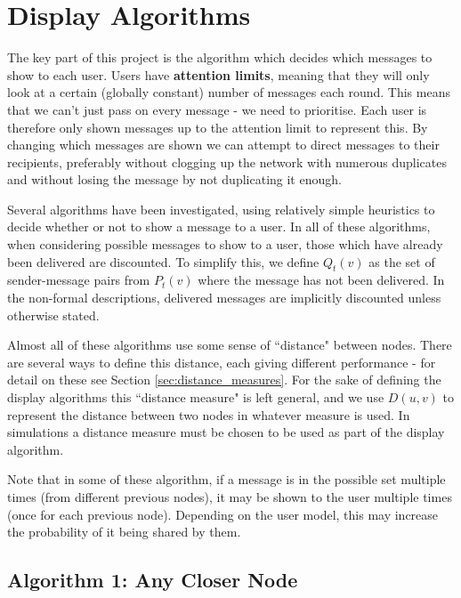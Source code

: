 \documentclass[bsc,frontabs,twoside,singlespacing,parskip,deptreport]{infthesis}     %
\begin{document}
\section{Display Algorithms} \label{sec:display_algorithms}
The key part of this project is the algorithm which decides which messages to show to each user. Users have \textbf{attention limits}, meaning that they will only look at a certain (globally constant) number of messages each round. This means that we can't just pass on every message - we need to prioritise. Each user is therefore only shown messages up to the attention limit to represent this. By changing which messages are shown we can attempt to direct messages to their recipients, preferably without clogging up the network with numerous duplicates and without losing the message by not duplicating it enough.

Several algorithms have been investigated, using relatively simple heuristics to decide whether or not to show a message to a user. In all of these algorithms, when considering possible messages to show to a user, those which have already been delivered are discounted. To simplify this, we define $Q_{t}(v)$ as the set of sender-message pairs from $P_{t}(v)$ where the message has not been delivered. In the non-formal descriptions, delivered messages are implicitly discounted unless otherwise stated.

Almost all of these algorithms use some sense of ``distance" between nodes. There are several ways to define this distance, each giving different performance - for detail on these see Section \ref{sec:distance_measures}. For the sake of defining the display algorithms this ``distance measure" is left general, and we use $D(u, v)$ to represent the distance between two nodes in whatever measure is used. In simulations a distance measure must be chosen to be used as part of the display algorithm.

Note that in some of these algorithm, if a message is in the possible set multiple times (from different previous nodes), it may be shown to the user multiple times (once for each previous node). Depending on the user model, this may increase the probability of it being shared by them.

\subsection{Algorithm 1: Any Closer Node}
\end{document}
